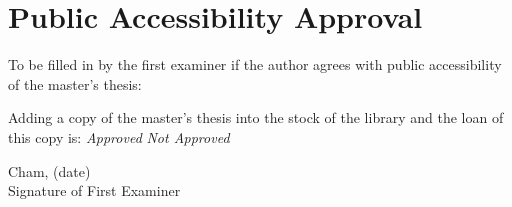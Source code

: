 \documentclass{article}
\begin{document}
\vspace{1cm}

\section*{Public Accessibility Approval}
To be filled in by the first examiner if the author agrees with public accessibility of the master's thesis:

\vspace{0.5cm}
Adding a copy of the master's thesis into the stock of the library and the loan of this copy is: \textit{Approved} \hspace{1.5cm} \textit{Not Approved}

\vspace{1cm}
\begin{flushright}
Cham, (date) \\
Signature of First Examiner
\end{flushright}
\end{document}
